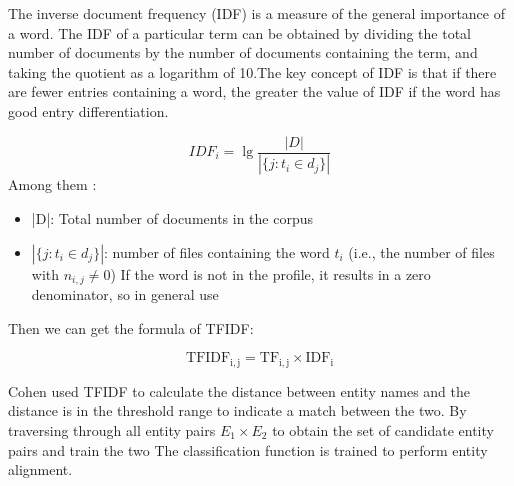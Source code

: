 \documentclass[sigconf]{acmart}
\begin{document}
The inverse document frequency (IDF) is a measure of the general importance of a word. The IDF of a particular term can be obtained by dividing the total number of documents by the number of documents containing the term, and taking the quotient as a logarithm of 10.The key concept of IDF is that if there are fewer entries containing a word, the greater the value of IDF if the word has good entry differentiation.

\begin{equation}
      {IDF_{i}} =\lg {\frac {|D|}{|\{j:t_{i}\in d_{j}\}|}}
\end{equation}
Among them :

\begin{itemize}
    \item |D|: Total number of documents in the corpus
    \item $|\{j:t_{{i}}\in d_{{j}}\}|$: number of files containing the word $t_{{i}}$ (i.e., the number of files with $n_{{i,j}}\neq 0$) If the word is not in the profile, it results in a zero denominator, so in general use 
\end{itemize}
Then we can get the formula of TFIDF:

\begin{equation}
    {\mathrm  {TF{}IDF_{{i,j}}}}={\mathrm  {TF_{{i,j}}}}\times {\mathrm  {IDF_{{i}}}}
\end{equation}

Cohen \cite{cohen2002learning} used TFIDF to calculate the distance between entity names
and the distance is in the threshold range to indicate a match between the two. By traversing
through all entity pairs $E_1 \times E_2$ to obtain the set of candidate entity pairs and train the two The classification function is trained to perform entity alignment. 
\end{document}

